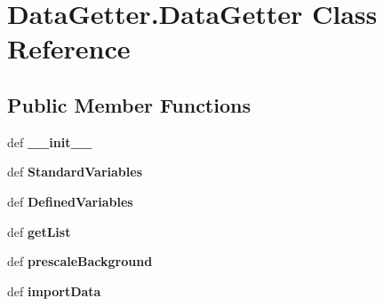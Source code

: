 \hypertarget{classDataGetter_1_1DataGetter}{\section{Data\-Getter.\-Data\-Getter Class Reference}
\label{classDataGetter_1_1DataGetter}
}
\subsection*{Public Member Functions}
\begin{DoxyCompactItemize}
\item 
\hypertarget{classDataGetter_1_1DataGetter_a9b80011f43e1928b3cbcf53417add1c9}{def {\bfseries \-\_\-\-\_\-init\-\_\-\-\_\-}}\label{classDataGetter_1_1DataGetter_a9b80011f43e1928b3cbcf53417add1c9}

\item 
\hypertarget{classDataGetter_1_1DataGetter_a185354693ff9e0d0433f2c27591afbbf}{def {\bfseries Standard\-Variables}}\label{classDataGetter_1_1DataGetter_a185354693ff9e0d0433f2c27591afbbf}

\item 
\hypertarget{classDataGetter_1_1DataGetter_aeb839377e4bfab6da9c83ec70be291cd}{def {\bfseries Defined\-Variables}}\label{classDataGetter_1_1DataGetter_aeb839377e4bfab6da9c83ec70be291cd}

\item 
\hypertarget{classDataGetter_1_1DataGetter_af8c40c8e6ee7597e785d6e967d1b90c2}{def {\bfseries get\-List}}\label{classDataGetter_1_1DataGetter_af8c40c8e6ee7597e785d6e967d1b90c2}

\item 
\hypertarget{classDataGetter_1_1DataGetter_ab1c1ff5985bdd64e20eb6a1292c2afa5}{def {\bfseries prescale\-Background}}\label{classDataGetter_1_1DataGetter_ab1c1ff5985bdd64e20eb6a1292c2afa5}

\item 
\hypertarget{classDataGetter_1_1DataGetter_aa9320b82c24d8e5885881891c7e58dce}{def {\bfseries import\-Data}}\label{classDataGetter_1_1DataGetter_aa9320b82c24d8e5885881891c7e58dce}

\end{DoxyCompactItemize}
